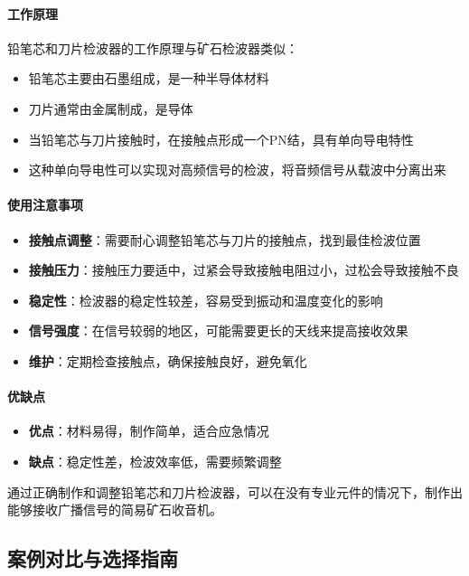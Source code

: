 \documentclass[12pt,UTF8]{ctexbook}
\begin{document}
\paragraph{工作原理}
铅笔芯和刀片检波器的工作原理与矿石检波器类似：
\begin{itemize}
  \item 铅笔芯主要由石墨组成，是一种半导体材料
  \item 刀片通常由金属制成，是导体
  \item 当铅笔芯与刀片接触时，在接触点形成一个PN结，具有单向导电特性
  \item 这种单向导电性可以实现对高频信号的检波，将音频信号从载波中分离出来
\end{itemize}

\paragraph{使用注意事项}
\begin{itemize}
  \item \textbf{接触点调整}：需要耐心调整铅笔芯与刀片的接触点，找到最佳检波位置
  \item \textbf{接触压力}：接触压力要适中，过紧会导致接触电阻过小，过松会导致接触不良
  \item \textbf{稳定性}：检波器的稳定性较差，容易受到振动和温度变化的影响
  \item \textbf{信号强度}：在信号较弱的地区，可能需要更长的天线来提高接收效果
  \item \textbf{维护}：定期检查接触点，确保接触良好，避免氧化
\end{itemize}

\paragraph{优缺点}
\begin{itemize}
  \item \textbf{优点}：材料易得，制作简单，适合应急情况
  \item \textbf{缺点}：稳定性差，检波效率低，需要频繁调整
\end{itemize}

通过正确制作和调整铅笔芯和刀片检波器，可以在没有专业元件的情况下，制作出能够接收广播信号的简易矿石收音机。

\subsection{案例对比与选择指南}
\end{document}
